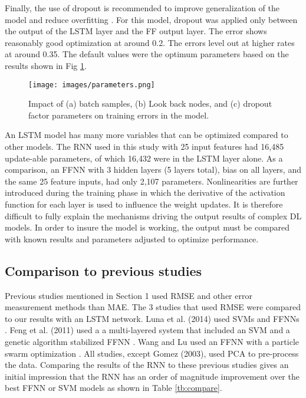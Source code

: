 \begin{linenumbers}
Finally, the use of dropout is recommended to improve generalization of the model and reduce overfitting \citep{Gal2016}. For this model, dropout was applied only between the output of the LSTM layer and the FF output layer. The error shows reasonably good optimization at around 0.2. The errors level out at higher rates at around 0.35. The default values were the optimum parameters based on the results shown in Fig \ref{fig:parameters}.
%
\begin{figure}[H]
\centering
\texttt{[image: images/parameters.png]}
\caption[Impact of model parameters on training error]{Impact of (a) batch samples, (b) Look back nodes, and (c) dropout factor parameters on training errors in the model.}
\label{fig:parameters}
\end{figure}
%

An LSTM model has many more variables that can be optimized compared to other models. The RNN used in this study with 25 input features had 16,485 update-able parameters, of which 16,432 were in the LSTM layer alone. As a comparison, an FFNN with 3 hidden layers (5 layers total), bias on all layers, and the same 25 feature inputs, had only 2,107 parameters. Nonlinearities are further introduced during the training phase in which the derivative of the activation function for each layer is used to influence the weight updates. It is therefore difficult to fully explain the mechanisms driving the output results of complex DL models. In order to insure the model is working, the output must be compared with known results and parameters adjusted to optimize performance.

\subsection{Comparison to previous studies}
Previous studies mentioned in Section 1 used RMSE and other error measurement methods than MAE. The 3 studies that used RMSE were compared to our results with an LSTM network. Luna et al. (2014) used SVMs and FFNNs \citep{Luna2014}. Feng et al. (2011) used a a multi-layered system that included an SVM and a genetic algorithm stabilized FFNN \citep{Feng2011}. Wang and Lu used an FFNN with a particle swarm optimization \citep{Wang2006}. All studies, except Gomez (2003), used PCA to pre-process the data. Comparing the results of the RNN to these previous studies gives an initial impression  that the RNN has an order of magnitude improvement over the best FFNN or SVM models as shown in Table \ref{tb:compare}.
%
\end{linenumbers}
